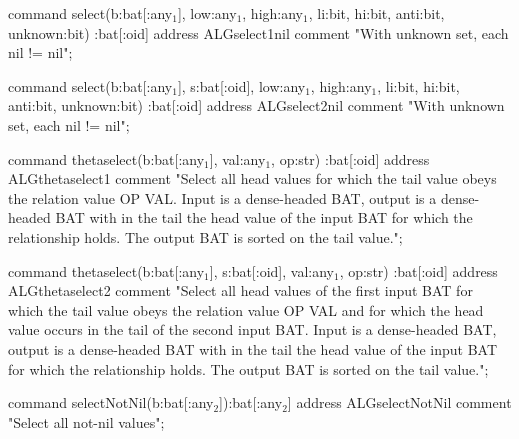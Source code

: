 \documentclass[11pt]{article}
\begin{document}
command select(b:bat[:any\(_{\text{1}}\)], low:any\(_{\text{1}}\), high:any\(_{\text{1}}\), li:bit, hi:bit, anti:bit, unknown:bit) :bat[:oid]
address ALGselect1nil
comment "With unknown set, each nil != nil";

command select(b:bat[:any\(_{\text{1}}\)], s:bat[:oid], low:any\(_{\text{1}}\), high:any\(_{\text{1}}\), li:bit, hi:bit, anti:bit, unknown:bit) :bat[:oid]
address ALGselect2nil
comment "With unknown set, each nil != nil";

command thetaselect(b:bat[:any\(_{\text{1}}\)], val:any\(_{\text{1}}\), op:str) :bat[:oid]
address ALGthetaselect1
comment "Select all head values for which the tail value obeys the relation
	value OP VAL.
	Input is a dense-headed BAT, output is a dense-headed BAT with in
	the tail the head value of the input BAT for which the
	relationship holds.  The output BAT is sorted on the tail value.";

command thetaselect(b:bat[:any\(_{\text{1}}\)], s:bat[:oid], val:any\(_{\text{1}}\), op:str) :bat[:oid]
address ALGthetaselect2
comment "Select all head values of the first input BAT for which the tail value
	obeys the relation value OP VAL and for which the head value occurs in
	the tail of the second input BAT.
	Input is a dense-headed BAT, output is a dense-headed BAT with in
	the tail the head value of the input BAT for which the
	relationship holds.  The output BAT is sorted on the tail value.";


command selectNotNil(b:bat[:any\(_{\text{2}}\)]):bat[:any\(_{\text{2}}\)]
address ALGselectNotNil
comment "Select all not-nil values";
\end{document}
